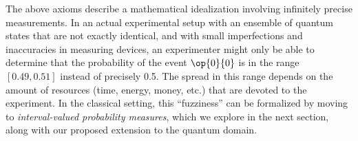 \documentclass[english,reprint, aps, prl,superscriptaddress, showpacs,
showkeys, longbibliography, amsmath, amssymb]{revtex4-1}
\theoremstyle{plain}
\theoremstyle{definition}
\newcommand{\events}{\ensuremath{\mathcal{E}}}
\newcommand{\proj}[1]{\op{#1}{#1}}
\newcommand{\Tr}{\ensuremath{\mathop{\mathrm{Tr}}\nolimits}}
\newcommand{\nb}{\nolinebreak[1] }
\begin{document}
The above axioms describe a mathematical idealization involving
infinitely precise measurements. In an actual experimental setup with
an ensemble of quantum states that are not exactly identical, and with
small imperfections and inaccuracies in measuring devices, an
experimenter might only be able to determine that the probability of
the event $\proj{0}$ is in the range $[0.49,0.51]$ instead of
precisely 0.5. The spread in this range depends on the amount of
resources (time, energy, money, etc.) that are devoted to the
experiment. In the classical setting, this ``fuzziness'' can be formalized
by moving to \emph{interval-valued probability measures}, which we explore in
the next section, along with our proposed extension to the quantum domain.


\end{document}
